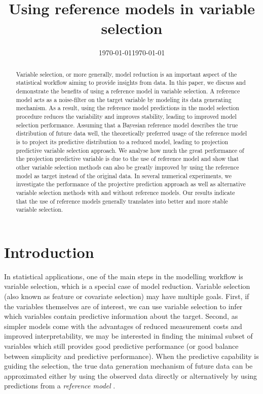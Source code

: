 \documentclass[a4]{article}
\title{Using reference models in variable selection 
	\vspace{.1in}}
\date{\today}
\date{\today}
\theoremstyle{definition}
\begin{document}
\maketitle
\begin{abstract}
  Variable selection, or more generally, model reduction is an important aspect of the statistical workflow aiming to provide insights from data. In this paper, we discuss and demonstrate the benefits of using a reference model in variable selection. A reference model acts as a noise-filter on the target variable by modeling its data generating mechanism. As a result, using the reference model predictions in the model selection procedure reduces the variability and improves stability, leading to improved model selection performance. Assuming that a Bayesian reference model describes the true distribution of future data well, the theoretically preferred usage of the reference model is to project its predictive distribution to a reduced model, leading to projection predictive variable selection approach. We analyse how much the great performance of the projection predictive variable is due to the use of reference model and show that other variable selection methods can also be greatly improved by using the reference model as target instead of the original data. In several numerical experiments, we investigate the performance of the projective prediction approach as well as alternative variable selection methods with and without reference models. Our results indicate that the use of reference models generally translates into better and more stable variable selection.
\end{abstract}

\hypertarget{introduction}{%
\section{Introduction}\label{introduction}}

In statistical applications, one of the main steps in the modelling
workflow is variable selection, which is a special case of
model reduction. Variable selection (also known as feature or 
covariate selection) may have multiple goals.  First,
if the variables themselves are of interest, we can use variable
selection to infer which variables contain predictive information
about the target. Second, as simpler models come with the
advantages of reduced measurement costs and improved interpretability,
we may be interested in finding the minimal subset of variables which
still provides good predictive performance (or good balance between
simplicity and predictive performance).  When the predictive
capability is guiding the selection, the true data generation
mechanism of future data can be approximated either by using the
observed data directly or alternatively by using predictions from a
\emph{reference model} \citep{vehtari2012survey}.
\end{document}
